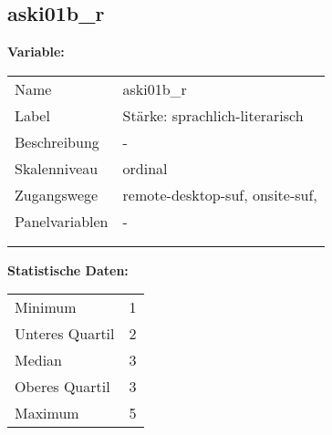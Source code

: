 	
	
	\subsection{aski01b\_r}
	\label{subSection:aski01b_r}

	\noindent\textbf{Variable:}\\
		\begin{tabular}{lL{11.3cm}}
			\label{tableVariable:aski01b_r}
			Name & aski01b\_r \\
			Label & Stärke: sprachlich-literarisch \\
			Beschreibung & - \\
			Skalenniveau & ordinal \\
			Zugangswege &
				remote-desktop-suf,
				onsite-suf,
 \\
			Panelvariablen & -
			 \\
			 \\
 \\
		\end{tabular}



		\vspace*{1 cm}
		\noindent\textbf{Statistische Daten:}\\
			\begin{tabular}{ll}
				\label{tableStatistics:aski01b_r}
					Minimum & 1 \\
					Unteres Quartil & 2 \\
					Median & 3 \\
					Oberes Quartil & 3 \\
					Maximum & 5 \\
			\end{tabular}



